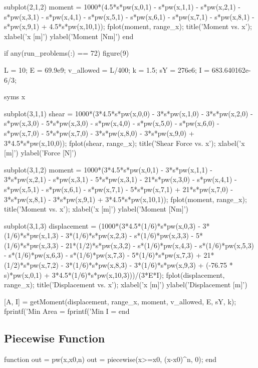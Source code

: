 \documentclass[a4paper]{article}
\begin{document}
\begin{verbatim*}
    subplot(2,1,2)
    moment = 1000*(4.5*s*pw(x,0,1) - s*pw(x,1,1) - s*pw(x,2,1) - s*pw(x,3,1) - s*pw(x,4,1) - s*pw(x,5,1) - s*pw(x,6,1) - s*pw(x,7,1) - s*pw(x,8,1) - s*pw(x,9,1) + 4.5*s*pw(x,10,1));
    fplot(moment, range_x);
    title('Moment vs. x');
    xlabel('x [m]')
    ylabel('Moment [Nm]')
end

if any(run_problems(:) == 72)
    figure(9)

    L = 10; %
    E = 69.9e9; %
    v_allowed = L/400; %
    k = 1.5; %
    sY = 276e6; %
    I = 683.640162e-6/3;

    syms x

    subplot(3,1,1)
    shear = 1000*(3*4.5*s*pw(x,0,0) - 3*s*pw(x,1,0) - 3*s*pw(x,2,0) - s*pw(x,3,0) - 5*s*pw(x,3,0) - s*pw(x,4,0) - s*pw(x,5,0) - s*pw(x,6,0) - s*pw(x,7,0) - 5*s*pw(x,7,0) - 3*s*pw(x,8,0) - 3*s*pw(x,9,0) + 3*4.5*s*pw(x,10,0));
    fplot(shear, range_x);
    title('Shear Force vs. x');
    xlabel('x [m]')
    ylabel('Force [N]')

    subplot(3,1,2)
    moment = 1000*(3*4.5*s*pw(x,0,1) - 3*s*pw(x,1,1) - 3*s*pw(x,2,1) - s*pw(x,3,1) - 5*s*pw(x,3,1) - 21*s*pw(x,3,0) - s*pw(x,4,1) - s*pw(x,5,1) - s*pw(x,6,1) - s*pw(x,7,1) - 5*s*pw(x,7,1) + 21*s*pw(x,7,0) - 3*s*pw(x,8,1) - 3*s*pw(x,9,1) + 3*4.5*s*pw(x,10,1));
    fplot(moment, range_x);
    title('Moment vs. x');
    xlabel('x [m]')
    ylabel('Moment [Nm]')
    
    subplot(3,1,3)
    displacement = (1000*(3*4.5*(1/6)*s*pw(x,0,3) - 3*(1/6)*s*pw(x,1,3) - 3*(1/6)*s*pw(x,2,3) - s*(1/6)*pw(x,3,3) - 5*(1/6)*s*pw(x,3,3) - 21*(1/2)*s*pw(x,3,2) - s*(1/6)*pw(x,4,3) - s*(1/6)*pw(x,5,3) - s*(1/6)*pw(x,6,3) - s*(1/6)*pw(x,7,3) - 5*(1/6)*s*pw(x,7,3) + 21*(1/2)*s*pw(x,7,2) - 3*(1/6)*s*pw(x,8,3) - 3*(1/6)*s*pw(x,9,3) + (-76.75 * s)*pw(x,0,1) + 3*4.5*(1/6)*s*pw(x,10,3)))/(3*E*I);
    fplot(displacement, range_x);
    title('Displacement vs. x');
    xlabel('x [m]')
    ylabel('Displacement [m]')

    [A, I] = getMoment(displacement, range_x, moment, v_allowed, E, sY, k);
    fprintf('Min Area = %
    fprintf('Min I = %
end
\end{verbatim*}
\subsection{Piecewise Function}
\begin{verbatim*}
function out = pw(x,x0,n)
    out = piecewise(x>=x0, (x-x0)^n, 0);
end
\end{verbatim*}
\end{document}
